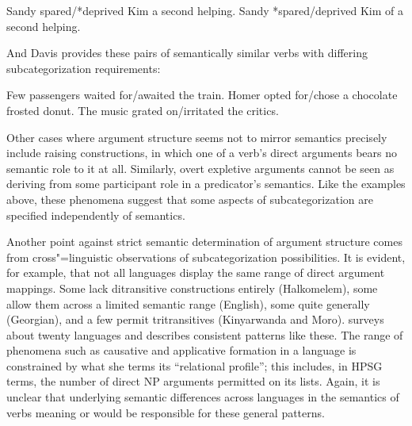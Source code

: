 \documentclass[output=paper
	        ,collection
	        ,collectionchapter
 	        ,biblatex
                ,babelshorthands
                ,newtxmath
                ,draftmode
                ,colorlinks, citecolor=brown
]{langscibook}
\begin{document}
\begin{exe}
\ex \label{ps-subcat-ex}
\begin{xlist}
\ex    Sandy spared/*deprived Kim a second helping.
\ex    Sandy *spared/deprived Kim of a second helping.
\citep[ex.\ 214--215]{pollard+sag:1987}
\end{xlist}
\end{exe}

\noindent
And Davis provides these pairs of semantically similar verbs with differing subcategorization requirements:

\begin{exe}
\ex \label{ard-subcat-ex}
\begin{xlist}
\ex    Few passengers waited for/awaited the train.
\ex    Homer opted for/chose a chocolate frosted donut.
\ex    The music grated on/irritated the critics.
\citep[ex.\ 5.4]{Davis2001}
\end{xlist}
\end{exe}

Other cases where argument structure seems not to mirror semantics precisely include raising constructions, in which one of a verb's direct arguments bears no semantic role to it at all.
Similarly, overt expletive arguments cannot be seen as deriving from some participant role in a predicator's semantics.
Like the examples above, these phenomena suggest that some aspects of subcategorization are specified independently of semantics.

Another point against strict semantic determination of argument structure comes from cross"=linguistic observations of subcategorization possibilities.
It is evident, for example, that not all languages display the same range of direct argument mappings.
Some lack ditransitive  constructions entirely (Halkomelem), some allow them across a limited semantic range (English), some quite generally (Georgian), and a few permit tritransitives (Kinyarwanda and Moro).
\citet{Gerdts1992} surveys about twenty languages and describes consistent patterns like these.
The range of phenomena such as causative and applicative formation in a language is constrained by what she terms its ``relational profile''; this includes, in HPSG terms, the number of direct NP arguments permitted on its \argst lists.
Again, it is unclear that underlying semantic differences across languages in the semantics of verbs meaning  or  would be responsible for these general patterns.
\end{document}
